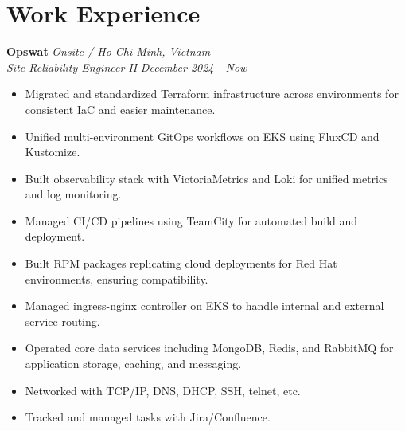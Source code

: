 \documentclass[11pt, a4paper]{article}
\begin{document}
\section{Work Experience}
\textbf{\href{https://www.opswat.com/}{Opswat}} \hfill {\small\textit{Onsite / Ho Chi Minh, Vietnam}} \\
\textit{Site Reliability Engineer II} \hfill {\small\textit{December 2024 - Now}}
\begin{itemize}[leftmargin=*]
    \item Migrated and standardized Terraform infrastructure across environments for consistent IaC and easier maintenance.
    \item Unified multi-environment GitOps workflows on EKS using FluxCD and Kustomize.
    \item Built observability stack with VictoriaMetrics and Loki for unified metrics and log monitoring.
    \item Managed CI/CD pipelines using TeamCity for automated build and deployment.
    \item Built RPM packages replicating cloud deployments for Red Hat environments, ensuring compatibility.
    \item Managed ingress-nginx controller on EKS to handle internal and external service routing.
    \item Operated core data services including MongoDB, Redis, and RabbitMQ for application storage, caching, and messaging.
    \item Networked with TCP/IP, DNS, DHCP, SSH, telnet, etc.
    \item Tracked and managed tasks with Jira/Confluence.
\end{itemize}
\end{document}
